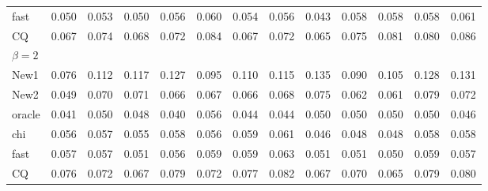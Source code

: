 \documentclass[review]{elsarticle}
\theoremstyle{plain}
\theoremstyle{definition}
\theoremstyle{remark}
\begin{document}
\begin{table}[ht]
\begin{tabular}{lllllllllllll}
fast & 0.050 & 0.053 & 0.050 & 0.056 & 0.060 & 0.054 & 0.056 & 0.043 & 0.058 & 0.058 & 0.058 & 0.061 \\ 
CQ & 0.067 & 0.074 & 0.068 & 0.072 & 0.084 & 0.067 & 0.072 & 0.065 & 0.075 & 0.081 & 0.080 & 0.086 \\ 
    $\beta=2$\\
New1 & 0.076 & 0.112 & 0.117 & 0.127 & 0.095 & 0.110 & 0.115 & 0.135 & 0.090 & 0.105 & 0.128 & 0.131 \\ 
New2 & 0.049 & 0.070 & 0.071 & 0.066 & 0.067 & 0.066 & 0.068 & 0.075 & 0.062 & 0.061 & 0.079 & 0.072 \\ 
oracle & 0.041 & 0.050 & 0.048 & 0.040 & 0.056 & 0.044 & 0.044 & 0.050 & 0.050 & 0.050 & 0.050 & 0.046 \\ 
chi & 0.056 & 0.057 & 0.055 & 0.058 & 0.056 & 0.059 & 0.061 & 0.046 & 0.048 & 0.048 & 0.058 & 0.058 \\ 
fast & 0.057 & 0.057 & 0.051 & 0.056 & 0.059 & 0.059 & 0.063 & 0.051 & 0.051 & 0.050 & 0.059 & 0.057 \\ 
 CQ & 0.076 & 0.072 & 0.067 & 0.079 & 0.072 & 0.077 & 0.082 & 0.067 & 0.070 & 0.065 & 0.079 & 0.080 \\ 
\bottomrule
\end{tabular}
\end{table}
\end{document}
